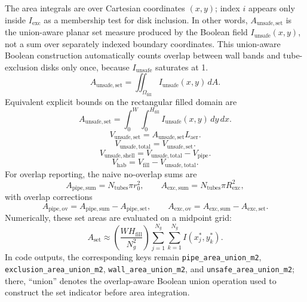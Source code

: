 \documentclass[11pt]{article}
\newcommand{\code}[1]{\nolinkurl{#1}}
\begin{document}
The area integrals are over Cartesian coordinates \((x,y)\); index \(i\) appears only inside \(I_{\mathrm{exc}}\) as a membership test for disk inclusion. In other words, \(A_{\mathrm{unsafe,set}}\) is the union-aware planar set measure produced by the Boolean field \(I_{\mathrm{unsafe}}(x,y)\), not a sum over separately indexed boundary coordinates. This union-aware Boolean construction automatically counts overlap between wall bands and tube-exclusion disks only once, because \(I_{\mathrm{unsafe}}\) saturates at 1.
\begin{equation}
\label{eq:unsafe_set_area}
A_{\mathrm{unsafe,set}}=\iint_{\Omega_{\mathrm{fill}}} I_{\mathrm{unsafe}}(x,y)\,dA.
\end{equation}
Equivalent explicit bounds on the rectangular filled domain are
\begin{equation}
\label{eq:unsafe_set_area_bounds}
A_{\mathrm{unsafe,set}}=\int_{0}^{W}\int_{0}^{H_{\mathrm{fill}}} I_{\mathrm{unsafe}}(x,y)\,dy\,dx.
\end{equation}
\begin{equation}
\label{eq:unsafe_set_volume}
V_{\mathrm{unsafe,set}}=A_{\mathrm{unsafe,set}}L_{\mathrm{aer}}.
\end{equation}
\begin{equation}
\label{eq:unsafe_total_volume}
V_{\mathrm{unsafe,total}}=V_{\mathrm{unsafe,set}}.
\end{equation}
\begin{equation}
\label{eq:unsafe_shell_volume}
V_{\mathrm{unsafe,shell}}=V_{\mathrm{unsafe,total}}-V_{\mathrm{pipe}}.
\end{equation}
\begin{equation}
\label{eq:habitable_volume}
V_{\mathrm{hab}}=V_{\mathrm{fill}}-V_{\mathrm{unsafe,total}}.
\end{equation}
For overlap reporting, the naive no-overlap sums are
\begin{equation}
\label{eq:naive_overlap_sums}
A_{\mathrm{pipe,sum}}=N_{\mathrm{tubes}}\pi r_0^2,
\qquad
A_{\mathrm{exc,sum}}=N_{\mathrm{tubes}}\pi R_{\mathrm{exc}}^2,
\end{equation}
with overlap corrections
\begin{equation}
\label{eq:overlap_corrections}
A_{\mathrm{pipe,ov}}=A_{\mathrm{pipe,sum}}-A_{\mathrm{pipe,set}},
\qquad
A_{\mathrm{exc,ov}}=A_{\mathrm{exc,sum}}-A_{\mathrm{exc,set}}.
\end{equation}
Numerically, these set areas are evaluated on a midpoint grid:
\begin{equation}
\label{eq:midpoint_set_area}
A_{\mathrm{set}}\approx \left(\frac{WH_{\mathrm{fill}}}{N_g^2}\right)\sum_{j=1}^{N_g}\sum_{k=1}^{N_g} I(x_j^\ast,y_k^\ast).
\end{equation}
In code outputs, the corresponding keys remain \code{pipe\_area\_union\_m2}, \code{exclusion\_area\_union\_m2}, \code{wall\_area\_union\_m2}, and \code{unsafe\_area\_union\_m2}; there, ``union'' denotes the overlap-aware Boolean union operation used to construct the set indicator before area integration.
\end{document}
